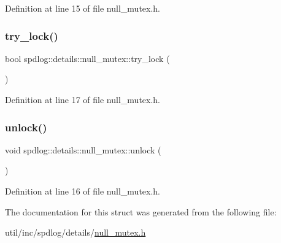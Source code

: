 Definition at line 15 of file null\+\_\+mutex.\+h.

\mbox{\label{structspdlog_1_1details_1_1null__mutex_a1e367b1adaa6305edbe163c4d2021c53}} 
\subsubsection{\texorpdfstring{try\+\_\+lock()}{try\_lock()}}
{\footnotesize\ttfamily bool spdlog\+::details\+::null\+\_\+mutex\+::try\+\_\+lock (\begin{DoxyParamCaption}{ }\end{DoxyParamCaption})\hspace{0.3cm}{\ttfamily [inline]}}



Definition at line 17 of file null\+\_\+mutex.\+h.

\mbox{\label{structspdlog_1_1details_1_1null__mutex_acbc27862ec43b4b0e9c8f5197174f95f}} 
\subsubsection{\texorpdfstring{unlock()}{unlock()}}
{\footnotesize\ttfamily void spdlog\+::details\+::null\+\_\+mutex\+::unlock (\begin{DoxyParamCaption}{ }\end{DoxyParamCaption})\hspace{0.3cm}{\ttfamily [inline]}}



Definition at line 16 of file null\+\_\+mutex.\+h.



The documentation for this struct was generated from the following file\+:\begin{DoxyCompactItemize}
\item 
util/inc/spdlog/details/\hyperlink{null__mutex_8h}{null\+\_\+mutex.\+h}\end{DoxyCompactItemize}
